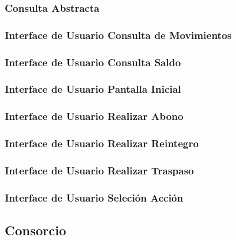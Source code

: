 \documentclass[a4paper,titlepage]{article}
\begin{document}
\subsubsection{Consulta Abstracta}

\subsubsection{Interface de Usuario Consulta de Movimientos}

\subsubsection{Interface de Usuario Consulta Saldo}

\subsubsection{Interface de Usuario Pantalla Inicial}

\subsubsection{Interface de Usuario Realizar Abono}

\subsubsection{Interface de Usuario Realizar Reintegro}

\subsubsection{Interface de Usuario Realizar Traspaso}

\subsubsection{Interface de Usuario Seleción Acción}



\subsection{Consorcio}
\end{document}
